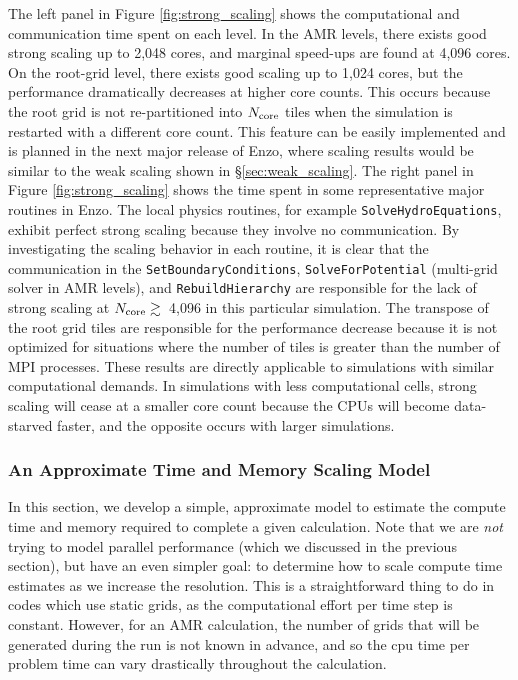 
The left panel in Figure \ref{fig:strong_scaling} shows the
computational and communication time spent on each level.  In the AMR
levels, there exists good strong scaling up to 2,048 cores, and
marginal speed-ups are found at 4,096 cores.  On the root-grid level,
there exists good scaling up to 1,024 cores, but the performance
dramatically decreases at higher core counts.  This occurs because the
root grid is not re-partitioned into $N_{\rm core}$ tiles when the
simulation is restarted with a different core count.  This feature can
be easily implemented and is planned in the next major release of
Enzo, where scaling results would be similar to the weak scaling shown
in \S\ref{sec:weak_scaling}.  The right panel in Figure
\ref{fig:strong_scaling} shows the time spent in some representative
major routines in Enzo.  The local physics routines, for example
\texttt{SolveHydroEquations}, exhibit perfect strong scaling because
they involve no communication.  By investigating the scaling behavior
in each routine, it is clear that the communication in the
\texttt{SetBoundaryConditions}, \texttt{SolveForPotential} (multi-grid
solver in AMR levels), and \texttt{RebuildHierarchy} are responsible
for the lack of strong scaling at $N_{\rm core} \gtrsim$~4,096 in this
particular simulation.  The transpose of the root grid tiles are
responsible for the performance decrease because it is not optimized
for situations where the number of tiles is greater than the number of
MPI processes.  These results are directly applicable to simulations
with similar computational demands.  In simulations with less
computational cells, strong scaling will cease at a smaller core count
because the CPUs will become data-starved faster, and the opposite
occurs with larger simulations.


\subsubsection{An Approximate Time and Memory Scaling Model}

In this section, we develop a simple, approximate model to estimate the compute time and memory required to complete a given calculation.  Note that we are {\it not} trying to model parallel performance (which we discussed in the previous section), but have an even simpler goal: to determine how to scale compute time estimates as we increase the resolution.  This is a straightforward thing to do in codes which use static grids, as the computational effort per time step is constant.  However, for an AMR calculation, the number of grids that will be generated during the run is not known in advance, and so the cpu time per problem time can vary drastically throughout the calculation.  

